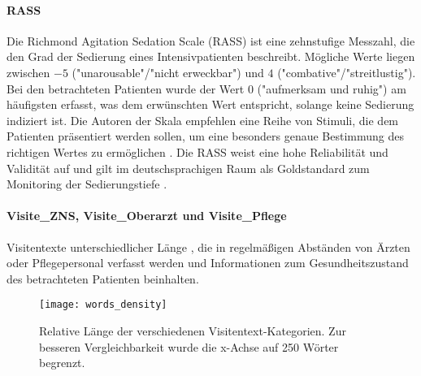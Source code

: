 \paragraph{RASS}
Die Richmond Agitation Sedation Scale (RASS) ist eine zehnstufige Messzahl, die den Grad der Sedierung eines Intensivpatienten beschreibt. Mögliche Werte liegen zwischen $-5$ ("unarousable"/"nicht erweckbar") und $4$ ("combative"/"streitlustig"). Bei den betrachteten Patienten wurde der Wert $0$ ("aufmerksam und ruhig") am häufigsten erfasst, was dem erwünschten Wert entspricht, solange keine Sedierung indiziert ist. Die Autoren der Skala empfehlen eine Reihe von Stimuli, die dem Patienten präsentiert werden sollen, um eine besonders genaue Bestimmung des richtigen Wertes zu ermöglichen \citep{sesslerRichmondAgitationSedation2002a}. Die RASS weist eine hohe Reliabilität und Validität auf und gilt im deutschsprachigen Raum als Goldstandard zum Monitoring der Sedierungstiefe \citep{marxIntensivmedizin2015c, muellerAnalgesieSedierungUnd2015}.


\paragraph{Visite\_ZNS, Visite\_Oberarzt und Visite\_Pflege}
Visitentexte unterschiedlicher Länge , die in regelmäßigen Abständen von Ärzten oder Pflegepersonal verfasst werden und Informationen zum Gesundheitszustand des betrachteten Patienten beinhalten.

\begin{figure}[htb]
    \captionsetup{justification=centering}
    \centering
    \texttt{[image: words\_density]}
    \caption{Relative Länge der verschiedenen Visitentext-Kategorien. Zur besseren Vergleichbarkeit wurde die x-Achse auf 250 Wörter begrenzt.}
    \label{fig:text_hist}
\end{figure}

